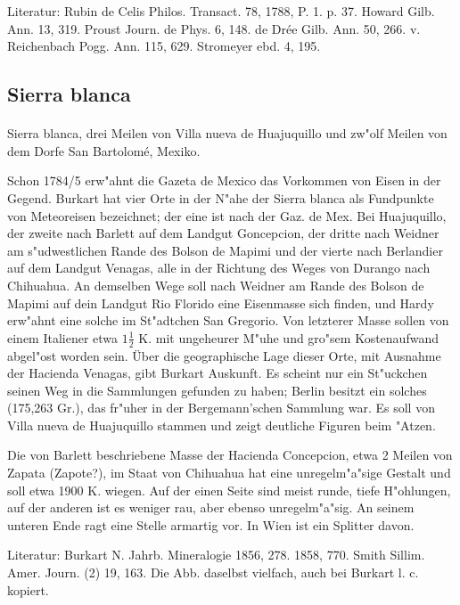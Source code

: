 \documentclass[a4paper, 11pt, oneside]{article}
\begin{document}
\footnotesize
Literatur: Rubin de Celis Philos. Transact. 78, 1788, P. 1. p. 37. Howard Gilb. Ann. 13, 319. Proust Journ. de Phys. 6, 148. de Drée Gilb. Ann. 50, 266. v. Reichenbach Pogg. Ann. 115, 629. Stromeyer ebd. 4, 195.

\subsection{Sierra blanca}
\normalsize
\paragraph{}
Sierra blanca, drei Meilen von Villa nueva de Huajuquillo und zw"olf Meilen von dem Dorfe San Bartolomé, Mexiko.

Schon 1784/5 erw"ahnt die Gazeta de Mexico das Vorkommen von Eisen in der Gegend. Burkart hat vier Orte in der N"ahe der Sierra blanca als Fundpunkte von Meteoreisen bezeichnet; der eine ist nach der Gaz. de Mex. Bei Huajuquillo, der zweite nach Barlett auf dem Landgut Goncepcion, der dritte nach Weidner am s"udwestlichen Rande des Bolson de Mapimi und der vierte nach Berlandier auf dem Landgut Venagas, alle in der Richtung des Weges von Durango nach Chihuahua. An demselben Wege soll nach Weidner am Rande des Bolson de Mapimi auf dein Landgut Rio Florido eine Eisenmasse sich finden, und Hardy erw"ahnt eine solche im St"adtchen San Gregorio. Von letzterer Masse sollen von einem Italiener etwa $1\frac{1}{2}$ K. mit ungeheurer M"uhe und gro"sem Kostenaufwand abgel"ost worden sein. Über die geographische Lage dieser Orte, mit Ausnahme der Hacienda Venagas, gibt Burkart Auskunft. Es scheint nur ein St"uckchen seinen Weg in die Sammlungen gefunden zu haben; Berlin besitzt ein solches (175,263 Gr.), das fr"uher in der Bergemann'schen Sammlung war. Es soll von Villa nueva de Huajuquillo stammen und zeigt deutliche Figuren beim "Atzen.

Die von Barlett beschriebene Masse der Hacienda Concepcion, etwa 2 Meilen von Zapata (Zapote?), im Staat von Chihuahua hat eine unregelm"a"sige Gestalt und soll etwa 1900 K. wiegen. Auf der einen Seite sind meist runde, tiefe H"ohlungen, auf der anderen ist es weniger rau, aber ebenso unregelm"a"sig. An seinem unteren Ende ragt eine Stelle armartig vor. In Wien ist ein Splitter davon.

\footnotesize
Literatur: Burkart N. Jahrb. Mineralogie 1856, 278. 1858, 770. Smith Sillim. Amer. Journ. (2) 19, 163. Die Abb. daselbst vielfach, auch bei Burkart l. c. kopiert.
\end{document}
